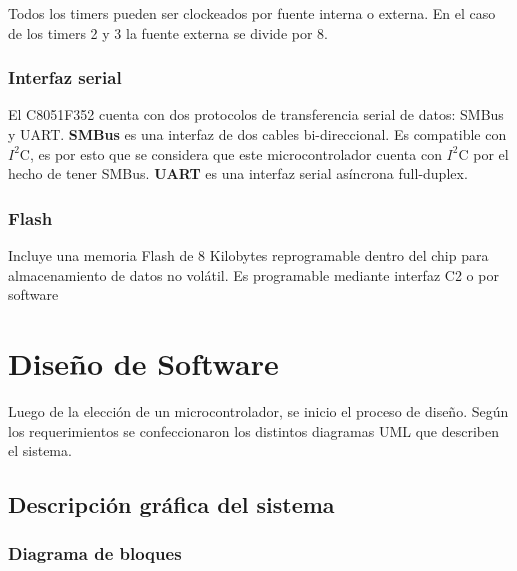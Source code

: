 \documentclass{article}
\theoremstyle{definition}
\theoremstyle{remark}
\begin{document}
Todos los timers pueden ser clockeados por fuente interna o externa. En el caso de los timers 2 y 3 la fuente externa se divide por 8.


\subsubsection{Interfaz serial} %
\label{ssub:interfaz_serial}

El C8051F352 cuenta con dos protocolos de transferencia serial de datos: SMBus y UART. \textbf{SMBus} es una interfaz de dos cables bi-direccional. Es compatible con $I^{2}$C, es por esto que se considera que este microcontrolador cuenta con $I^{2}$C por el hecho de tener SMBus. \textbf{UART} es una interfaz serial asíncrona full-duplex.


\subsubsection{Flash} %
\label{ssub:flash}

Incluye una memoria Flash de 8 Kilobytes reprogramable dentro del chip para almacenamiento de datos no volátil. Es programable mediante interfaz C2 o por software



\section{Diseño de Software} %
\label{sec:diseno_de_software}


Luego de la elección de un microcontrolador, se inicio el proceso de diseño. Según los requerimientos se confeccionaron los distintos diagramas UML que describen el sistema.

\subsection{Descripción gráfica del sistema} %
\label{sub:descripcion_grafica_del_sistema}

\subsubsection{Diagrama de bloques} %
\label{ssub:diagrama_de_bloques}
\end{document}
